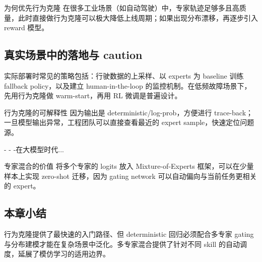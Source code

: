 \begin{knowledgebox}{为何优先行为克隆}
在很多工业场景（如自动驾驶）中，专家轨迹足够多且高质量，此时直接做行为克隆可以极大降低上线周期；如果出现分布漂移，再逐步引入 reward 模型。
\end{knowledgebox}

\subsection{真实场景中的落地与 caution}

实际部署时常见的策略包括：行驶数据的上采样、以 experts 为 baseline 训练 fallback policy，以及建立 human-in-the-loop 的监控机制。在低频故障场景下，先用行为克隆做 warm-start，再用 RL 微调是普遍设计。

\begin{importantbox}{行为克隆的可解释性}
因为输出是 deterministic/log-prob，方便进行 trace-back；一旦模型输出异常，工程团队可以直接查看最近的 expert sample，快速定位问题源。
\end{importantbox}

-
-
-在大模型时代...

\begin{knowledgebox}{专家混合的价值}
将多个专家的 logits 放入 Mixture-of-Experts 框架，可以在少量样本上实现 zero-shot 迁移，因为 gating network 可以自动偏向与当前任务更相关的 expert。
\end{knowledgebox}

\subsection{本章小结}

行为克隆提供了最快速的入门路径、但 deterministic 回归必须配合多专家 gating 与分布建模才能在复杂场景中泛化。多专家混合提供了针对不同 skill 的自动调度，延展了模仿学习的适用边界。

